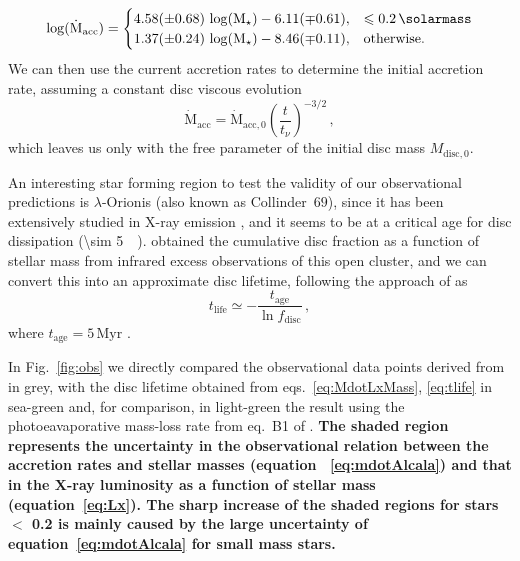 \documentclass[usenatbib,useAMS,usedcolumn]{mnras}
\begin{document}
\begin{equation}\label{eq:mdotAlcala}
    \log(\dot{\mathrm{M}}_\mathrm{acc}) = 
    \begin{cases}
      4.58 (\pm 0.68) \, \log(\mathrm{M}_\star) - 6.11(\mp 0.61), & \leq \SI{0.2}{\solarmass} \\
      1.37 (\pm 0.24) \, \log(\mathrm{M}_\star) - 8.46 (\mp 0.11), & \text{otherwise.}
    \end{cases}
\end{equation}
We can then use the current accretion rates to determine the initial accretion rate, assuming a constant disc viscous evolution
\begin{equation}\label{eq:mdot0}
    \dot{\mathrm{M}}_\mathrm{acc} = \dot{\mathrm{M}}_\mathrm{acc,0} \left(\frac{t}{t_\nu}\right)^{-3/2}\,,
\end{equation}
which leaves us only with the free parameter of the initial disc mass $M_\mathrm{disc,0}$.

An interesting star forming region to test the validity of our observational predictions is $\lambda$-Orionis (also known as Collinder~$69$), since it has been extensively studied in X-ray emission , and it seems to be at a critical age for disc dissipation (\SI{\sim 5}{\mega\year}).
 obtained the cumulative disc fraction as a function of stellar mass from infrared excess observations of this open cluster, and we can convert this into an approximate disc lifetime, following the approach of  as
\begin{equation}
    t_\mathrm{life} \simeq -\frac{t_\mathrm{age}}{\ln{f_\mathrm{disc}}}\, ,
\end{equation}
where $t_\mathrm{age} = 5\, \mathrm{Myr}$ .

In Fig.~\ref{fig:obs} we directly compared the observational data points derived from  in grey, with the disc lifetime obtained from eqs.~\ref{eq:MdotLxMass}, \ref{eq:tlife} in sea-green and, for comparison, in light-green the result using the photoeavaporative mass-loss rate from eq.~B1 of . \textbf{The shaded region represents the uncertainty in the observational relation between the accretion rates and stellar masses (equation~
\ref{eq:mdotAlcala}) and that in the X-ray luminosity as a function of stellar mass (equation~\ref{eq:Lx}). The sharp increase of the shaded regions for stars $<$ \SI{0.2}{\solarmass} is mainly caused by the large uncertainty of equation~\ref{eq:mdotAlcala} for small mass stars.}
\end{document}

